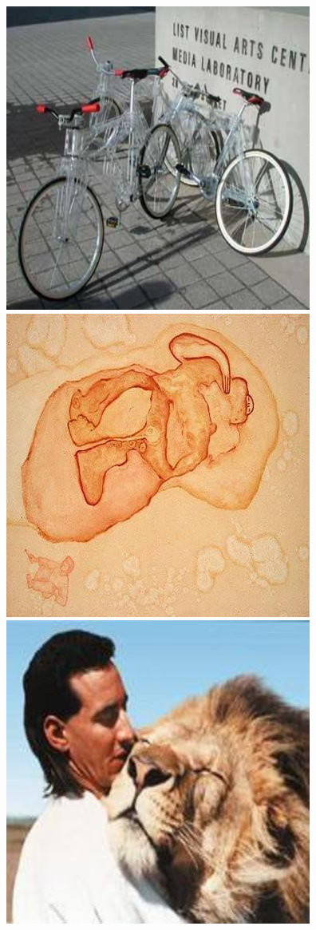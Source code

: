 \documentclass[oneside,a4paper,english,links]{amca}
\begin{document}
\begin{figure}[htb]
\centering
\includegraphics[scale=0.28]{exps/100sample/res/image_0351}
\includegraphics[scale=0.28]{exps/100sample/res/image_0019}
\includegraphics[scale=0.28]{exps/100sample/res/image_0027}

\end{figure}
\end{document}
